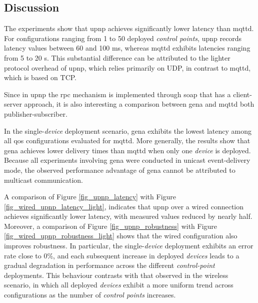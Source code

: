 \documentclass[lettersize,journal]{IEEEtran}
\begin{document}
\subsection{Discussion}

The experiments show that \gls{upnp} achieves significantly lower latency than \gls{mqttd}. For configurations ranging from 1 to 50 deployed \textit{control points}, \gls{upnp} records latency values between 60 and 100 ms, whereas \gls{mqttd} exhibits latencies ranging from 5 to 20 s. This substantial difference can be attributed to the lighter protocol overhead of \gls{upnp}, which relies primarily on UDP, in contrast to \gls{mqttd}, which is based on TCP.

Since in \gls{upnp} the \gls{rpc} mechanism is implemented through \gls{soap} that has a client-server approach, it is also interesting a comparison between \gls{gena} and \gls{mqttd} both publisher-subscriber.

In the single-\textit{device} deployment scenario, \gls{gena} exhibits the lowest latency among all \gls{qos} configurations evaluated for \gls{mqttd}. More generally, the results show that \gls{gena} achieves lower delivery times than \gls{mqttd} when only one \textit{device} is deployed. Because all experiments involving \gls{gena} were conducted in unicast event-delivery mode, the observed performance advantage of \gls{gena} cannot be attributed to multicast communication. 

A comparison of Figure \ref{fig_upnp_latency} with Figure \ref{fig_wired_upnp_latency_light}, indicates that \gls{upnp} over a wired connection achieves significantly lower latency, with measured values reduced by nearly half. 
Moreover, a comparison of Figure \ref{fig_upnp_robustness} with Figure \ref{fig_wired_upnp_robustness_light} shows that the wired configuration also improves robustness. In particular, the single-\textit{device} deployment exhibits an error rate close to 0\%, and each subsequent increase in deployed \textit{devices} leads to a gradual degradation in performance across the different \textit{control-point} deployments. This behaviour contrasts with that observed in the wireless scenario, in which all deployed \textit{devices} exhibit a more uniform trend across configurations as the number of \textit{control points} increases.
\end{document}
